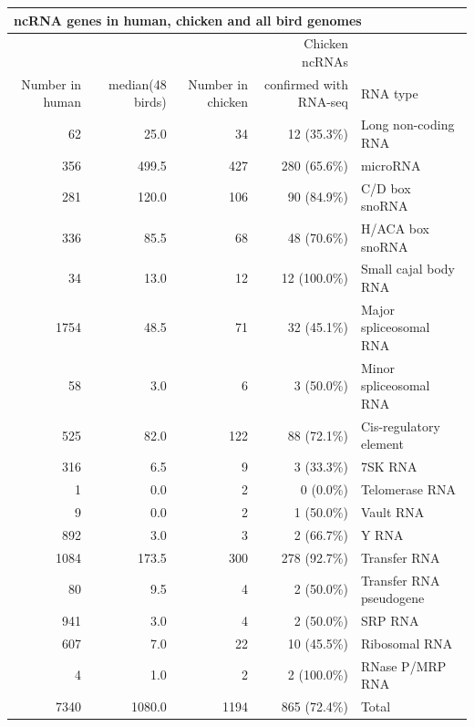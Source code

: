 \documentclass[10pt]{bmc_article}
\newenvironment{bmcformat}{\begin{raggedright}\baselineskip20pt\sloppy\setboolean{publ}{false}}{\end{raggedright}\baselineskip20pt\sloppy}
\begin{document}
\begin{bmcformat}
\begin{tabular}{|r|r|r|r|l|}
\hline 
\multicolumn{5}{|l|}{{\bf ncRNA genes in human, chicken and all bird genomes}}\\
\hline 
                &                  &                   & Chicken ncRNAs & \\
Number in human & median(48 birds) & Number in chicken & confirmed with RNA-seq & RNA type\\
\hline
62&25.0&34&12 (35.3\%) &Long non-coding RNA\\ 
356&499.5&427&280 (65.6\%) &microRNA\\ 
281&120.0&106&90 (84.9\%) &C/D box snoRNA\\ 
336&85.5&68&48 (70.6\%) &H/ACA box snoRNA\\ 
34&13.0&12&12 (100.0\%) &Small cajal body RNA\\ 
1754&48.5&71&32 (45.1\%) &Major spliceosomal RNA\\ 
58&3.0&6&3 (50.0\%) &Minor spliceosomal RNA\\ 
525&82.0&122&88 (72.1\%) &Cis-regulatory element\\ 
316&6.5&9&3 (33.3\%) &7SK RNA\\ 
1&0.0&2&0 (0.0\%) &Telomerase RNA\\ 
9&0.0&2&1 (50.0\%) &Vault RNA\\ 
892&3.0&3&2 (66.7\%) &Y RNA\\ 
1084&173.5&300&278 (92.7\%) &Transfer RNA\\ 
80&9.5&4&2 (50.0\%) &Transfer RNA pseudogene\\ 
941&3.0&4&2 (50.0\%) &SRP RNA\\ 
607&7.0&22&10 (45.5\%) &Ribosomal RNA\\ 
4&1.0&2&2 (100.0\%) &RNase P/MRP RNA\\ 
\hline
7340&1080.0&1194&865 (72.4\%) &Total\\ 
\hline
\end{tabular}


\end{bmcformat}
\end{document}
